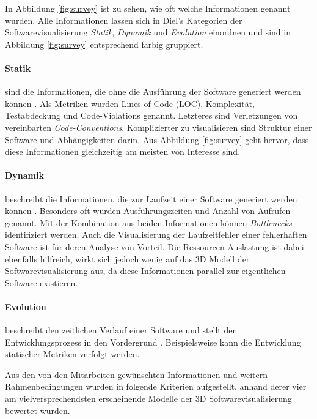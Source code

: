 In Abbildung \ref{fig:survey} ist zu sehen, wie oft welche Informationen genannt wurden. Alle Informationen lassen sich in Diel's Kategorien der Softwarevisualisierung \cite{diehl2007software} \textit{Statik}, \textit{Dynamik} und \textit{Evolution} einordnen und sind in Abbildung \ref{fig:survey} entsprechend farbig gruppiert.

\paragraph{Statik} sind die Informationen, die ohne die Ausführung der Software generiert werden können \cite{diehl2007software}. Als Metriken wurden Lines-of-Code (LOC), Komplexität, Testabdeckung und Code-Violations genannt. Letzteres sind Verletzungen von vereinbarten \emph{Code-Conventions}. Komplizierter zu visualisieren sind Struktur einer Software und Abhängigkeiten darin. Aus Abbildung \ref{fig:survey} geht hervor, dass diese Informationen gleichzeitig am meisten von Interesse sind.

\paragraph{Dynamik} beschreibt die Informationen, die zur Laufzeit einer Software generiert werden können \cite{diehl2007software}. Besonders oft wurden Ausführungszeiten und Anzahl von Aufrufen genannt. Mit der Kombination aus beiden Informationen können \emph{Bottlenecks} identifiziert werden. Auch die Visualisierung der Laufzeitfehler einer fehlerhaften Software ist für deren Analyse von Vorteil. Die Ressourcen-Auslastung ist dabei ebenfalls hilfreich, wirkt sich jedoch wenig auf das 3D Modell der Softwarevisualisierung aus, da diese Informationen parallel zur eigentlichen Software existieren.

\paragraph{Evolution} beschreibt den zeitlichen Verlauf einer Software und stellt den Entwicklungsprozess in den Vordergrund \cite{diehl2007software}. Beispielsweise kann die Entwicklung statischer Metriken verfolgt werden.

Aus den von den Mitarbeiten gewünschten Informationen und weitern Rahmenbedingungen wurden in \cite{puetz2017softwarevisualisierung} folgende Kriterien aufgestellt, anhand derer vier am vielversprechendsten erscheinende Modelle der 3D Softwarevisualisierung bewertet wurden.

